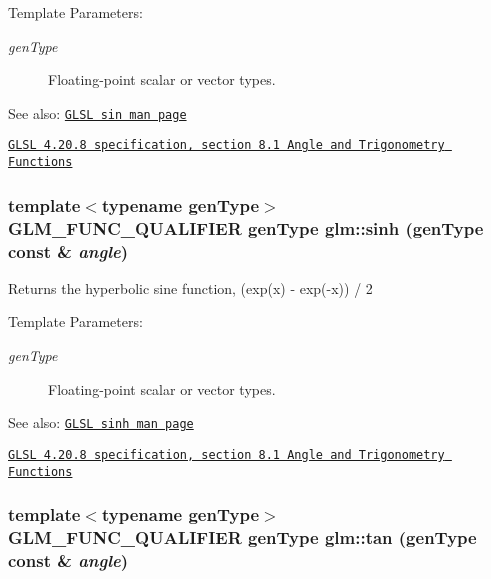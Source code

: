 \begin{Desc}
\item[Template Parameters:]
\begin{description}
\item[{\em genType}]Floating-point scalar or vector types.\end{description}
\end{Desc}
\begin{Desc}
\item[See also:]\href{http://www.opengl.org/sdk/docs/manglsl/xhtml/sin.xml}{\tt GLSL sin man page} 

\href{http://www.opengl.org/registry/doc/GLSLangSpec.4.20.8.pdf}{\tt GLSL 4.20.8 specification, section 8.1 Angle and Trigonometry Functions} \end{Desc}
\hypertarget{group__core__func__trigonometric_g925002c6a847894241278997d189429a}{
\subsubsection[sinh]{\setlength{\rightskip}{0pt plus 5cm}template$<$typename genType$>$ GLM\_\-FUNC\_\-QUALIFIER genType glm::sinh (genType const \& {\em angle})}}
\label{group__core__func__trigonometric_g925002c6a847894241278997d189429a}


Returns the hyperbolic sine function, (exp(x) - exp(-x)) / 2

\begin{Desc}
\item[Template Parameters:]
\begin{description}
\item[{\em genType}]Floating-point scalar or vector types.\end{description}
\end{Desc}
\begin{Desc}
\item[See also:]\href{http://www.opengl.org/sdk/docs/manglsl/xhtml/sinh.xml}{\tt GLSL sinh man page} 

\href{http://www.opengl.org/registry/doc/GLSLangSpec.4.20.8.pdf}{\tt GLSL 4.20.8 specification, section 8.1 Angle and Trigonometry Functions} \end{Desc}
\hypertarget{group__core__func__trigonometric_g93a81f04757351ba92d924e237cbeb61}{
\subsubsection[tan]{\setlength{\rightskip}{0pt plus 5cm}template$<$typename genType$>$ GLM\_\-FUNC\_\-QUALIFIER genType glm::tan (genType const \& {\em angle})}}
\label{group__core__func__trigonometric_g93a81f04757351ba92d924e237cbeb61}


